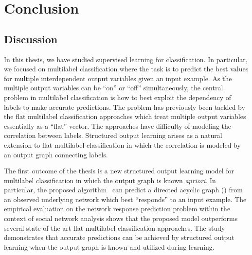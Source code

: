 {%
%
%
\chapter{Conclusion} \label{ch_conclusion}


\section{Discussion}

In this thesis, we have studied supervised learning for classification.
In particular, we focused on multilabel classification where the task is to predict the best values for multiple interdependent output variables given an input example.
As the multiple output variables can be ``on'' or ``off'' simultaneously, the central problem in multilabel classification is how to best exploit the dependency of labels to make accurate predictions.
The problem has previously been tackled by the flat multilabel classification approaches which treat multiple output variables essentially as a ``flat'' vector.
The approaches have difficulty of modeling the correlation between labels.
Structured output learning arises as a natural extension to flat multilabel classification in which the correlation is modeled by an output graph connecting labels.

The first outcome of the thesis is a new structured output learning model for multilabel classification in which the output graph is known \textit{apriori}.
In particular, the proposed algorithm \spin\ can predict a directed acyclic graph (\daggraph) from an observed underlying network which best ``responds'' to an input example.
The empirical evaluation on the network response prediction problem within the context of social network analysis shows that the proposed model outperforms several state-of-the-art flat multilabel classification approaches.
The study demonstrates that accurate predictions can be achieved by structured output learning when the output graph is known and utilized during learning.

}
